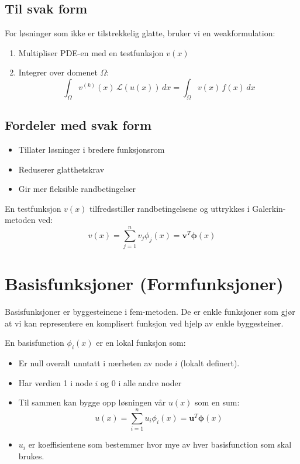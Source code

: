 \documentclass[../main.tex]{subfiles}
\begin{document}
\subsection{Til svak form}
For løsninger som ikke er tilstrekkelig glatte, bruker vi en weakformulation:

\begin{enumerate}
    \item Multipliser PDE-en med en testfunksjon $v(x)$
    \item Integrer over domenet $\Omega$:
          \[
              \int_\Omega v^{(k)}(x) \, \mathcal{L}(u(x)) \, dx = \int_\Omega v(x) \, f(x) \, dx
          \]
\end{enumerate}

\subsection{Fordeler med svak form}
\begin{itemize}
    \item Tillater løsninger i bredere funksjonsrom
    \item Reduserer glatthetskrav
    \item Gir mer fleksible randbetingelser
\end{itemize}

En testfunksjon $v(x)$ tilfredsstiller randbetingelsene og uttrykkes i Galerkin-metoden ved:
\[
    v(x) = \sum_{j=1}^n v_j \phi_j(x) = \symbf{v}^T \symbf{\phi}(x)
\]

\section{Basisfunksjoner (Formfunksjoner)}

Basisfunksjoner er byggesteinene i fem-metoden.
De er enkle funksjoner som gjør at vi kan representere en komplisert funksjon ved hjelp av enkle byggesteiner.

En basisfunction \(\phi_i(x)\) er en lokal funksjon som:
\begin{itemize}
    \item Er null overalt unntatt i nærheten av node \(i\) (lokalt definert).
    \item Har verdien 1 i node \(i\) og 0 i alle andre noder
    \item Til sammen kan bygge opp løsningen vår \(u(x)\) som en sum:
          \[
              u(x) = \sum_{i=1}^n u_i \phi_i(x) = \symbf{u}^T \symbf{\phi}(x)
          \]
    \item \(u_i\) er koeffisientene som bestemmer hvor mye av hver basisfunction som skal brukes.
\end{itemize}
\end{document}
